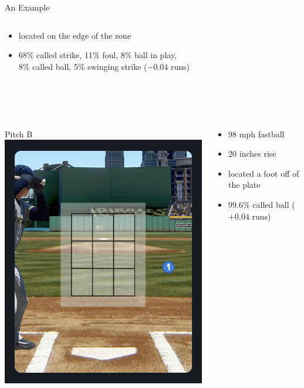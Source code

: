 \documentclass{beamer}
\begin{document}
\begin{frame}{An Example}
\begin{columns}
\begin{column}{0.8\textwidth}
\begin{itemize}
          \item located on the edge of the zone
          \item 68\% called strike, 11\% foul, 8\% ball in play,\\
            8\% called ball, 5\% swinging strike ($-0.04$ runs)
        \end{itemize}
      \end{column}
    \end{columns}
    ~\\
    ~\\
    \begin{columns}
      \begin{column}{0.2\textwidth}
        \centering
        Pitch B\\
        \includegraphics[width = \textwidth]{images/pitch_outside}
      \end{column}
      \begin{column}{0.8\textwidth}
        \begin{itemize}
          \item 98 mph fastball
          \item 20 inches rise
          \item located a foot off of the plate
          \item 99.6\% called ball ($+0.04$ runs)
        \end{itemize}
      \end{column}
    \end{columns}
  \end{frame}
\end{document}

